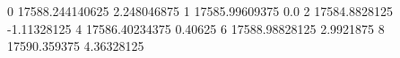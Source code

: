 0 17588.244140625 2.248046875
1 17585.99609375 0.0
2 17584.8828125 -1.11328125
4 17586.40234375 0.40625
6 17588.98828125 2.9921875
8 17590.359375 4.36328125
